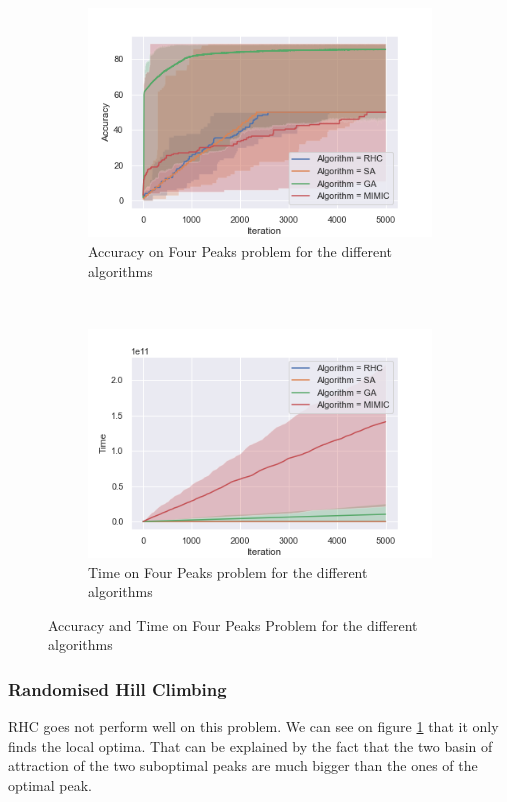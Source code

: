\documentclass[twocolumn, 10pt]{article}
\begin{document}
				\begin{figure}[h]
					\centering
					\begin{subfigure}[t]{\columnwidth}
						\centering
						\includegraphics[width=0.68\linewidth]{../graphics/four_peaks_all_Iteration_Error_Algorithm.png}
						\caption{Accuracy on Four Peaks problem for the different algorithms}
						\label{fp:all_accuracy}
					\end{subfigure}
					~
					\begin{subfigure}[t]{\columnwidth}
						\centering
						\includegraphics[width=0.68\linewidth]{../graphics/four_peaks_all_Iteration_Time_Algorithm.png}
						\caption{Time on Four Peaks problem for the different algorithms}
						\label{fp:all_time}
					\end{subfigure}
					\caption{Accuracy and Time on Four Peaks Problem for the different algorithms}
					\label{fp:all}
				\end{figure}
			\subsubsection*{Randomised Hill Climbing}
				RHC goes not perform well on this problem. We can see on figure \ref{fp:all_accuracy} that it only finds the local optima. That can be explained by the fact that the two  basin of attraction of the two suboptimal peaks are much bigger than the ones of the
				optimal peak.
\end{document}
